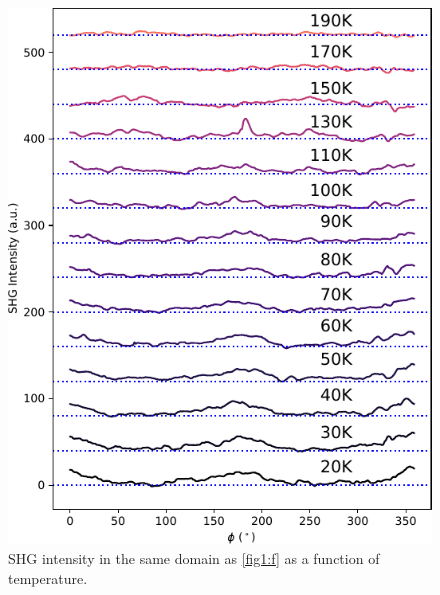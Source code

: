 \begin{figure}
\centering
\includegraphics[width=\textwidth]{./gfx/ch6/ctempdep.pdf}
\caption{\label{ctempdep}
SHG intensity in the same domain as \cref{fig1:f} as a function of temperature.
}
\end{figure}

